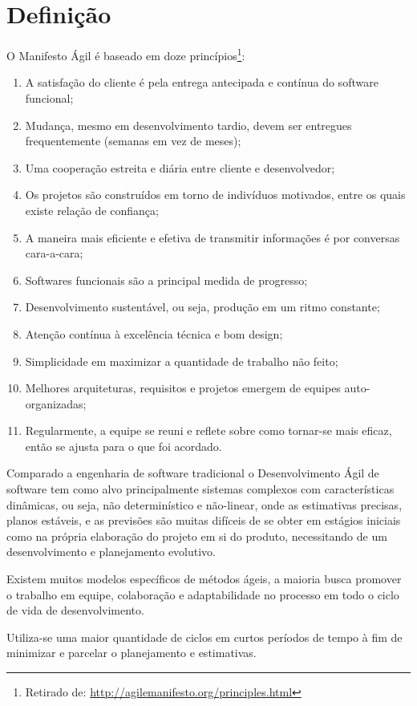 \section{Definição}
\par O Manifesto Ágil é baseado em doze princípios\footnote{ Retirado de: \url{http://agilemanifesto.org/principles.html}}:
\begin{enumerate}
  \item A satisfação do cliente é pela entrega antecipada e contínua do software funcional;
  \item Mudança, mesmo em desenvolvimento tardio, devem ser entregues frequentemente (semanas em vez de meses);
  \item Uma cooperação estreita e diária entre cliente e desenvolvedor;
  \item Os projetos são construídos em torno de indivíduos motivados, entre os quais existe relação de confiança;
  \item A maneira mais eficiente e efetiva de transmitir informações é por conversas cara-a-cara;
  \item Softwares funcionais são a principal medida de progresso;
  \item Desenvolvimento sustentável, ou seja, produção em um ritmo constante;
  \item Atenção contínua à excelência técnica e bom design;
  \item Simplicidade em maximizar a quantidade de trabalho não feito;
  \item Melhores arquiteturas, requisitos e projetos emergem de equipes auto-organizadas;
  \item Regularmente, a equipe se reuni e reflete sobre como tornar-se mais eficaz, então se ajusta para o que foi acordado.
\end{enumerate}
\par Comparado a engenharia de software tradicional o Desenvolvimento Ágil de software tem como alvo principalmente sistemas complexos com características dinâmicas, ou seja, não determinístico e não-linear, onde as estimativas precisas, planos estáveis, e as previsões são muitas difíceis de se obter em estágios iniciais como na própria elaboração do projeto em si do produto, necessitando de um desenvolvimento e planejamento evolutivo.
\par Existem muitos modelos específicos de métodos ágeis, a maioria busca promover o trabalho em equipe, colaboração e adaptabilidade no processo em todo o ciclo de vida de desenvolvimento.
\par Utiliza-se uma maior quantidade de ciclos em curtos períodos de tempo à fim de minimizar e parcelar o planejamento e estimativas.
